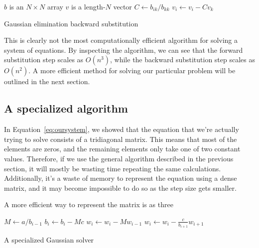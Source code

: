 \documentclass{article}
\begin{document}
        \begin{algorithm}[t]
            \begin{algorithmic}
                \Require $b$ is an $N \times N$ array
                \Require $v$ is a length-$N$ vector
                        \State $C \gets b_{ik} / b_{kk}$
                        \State $v_i \gets v_i - C v_k$
                    \EndFor
                \EndFor
            \end{algorithmic}
            \caption{Gaussian elimination backward substitution}
            \label{algo:gausback}
        \end{algorithm}

        This is clearly not the most computationally efficient algorithm for solving a system of equations. By inspecting the algorithm, we can see that the forward substitution step scales as $O(n^3)$, while the backward substitution step scales as $O(n^2)$. A more efficient method for solving our particular problem will be outlined in the next section.

    \subsection{A specialized algorithm}

        In Equation~\ref{eq:oursystem}, we showed that the equation that we're actually trying to solve consists of a tridiagonal matrix. This means that most of the elements are zeros, and the remaining elements only take one of two constant values. Therefore, if we use the general algorithm described in the previous section, it will mostly be wasting time repeating the same calculations. Additionally, it's a waste of memory to represent the equation using a dense matrix, and it may become impossible to do so as the step size gets smaller.

        A more efficient way to represent the matrix is as three

        \begin{algorithm}
            \begin{algorithmic}
                 
                    \State $M \gets a / b_{i-1}$
                    \State $b_i \gets b_i - Mc$
                    \State $w_i \gets w_i - Mw_{i-1}$
                \EndFor
                 
                    \State $w_i \gets w_i - \frac{c}{b_{i+1}} w_{i+1}$
                \EndFor
            \end{algorithmic}
            \caption{A specialized Gaussian solver}
        \end{algorithm}
\end{document}
